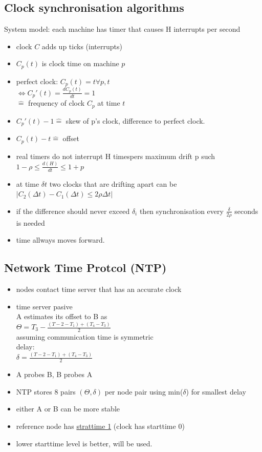 \documentclass[ngerman,a4paper]{report}
\begin{document}
\subsection{Clock synchronisation algorithms}
System model: each machine has timer that causes H interrupts per second
\begin{itemize}
	\item clock $C$ adds up ticks (interrupts)
	\item $C_p(t)$ is clock time on machine $p$
	\item perfect clock: $C_p(t) = t \forall p, t$ \\
	$\Longleftrightarrow C_p'(t) = \frac{d C_p(t)}{dt} = 1$\\
	$\mathrel{\widehat{=}}$ frequency of clock $C_p$ at time $t$
	\item $C_p'(t) - 1 \mathrel{\widehat{=}}$ skew of p's clock, difference to perfect clock.
	\item $C_p(t)-t \mathrel{\widehat{=}}$ offset
	\item real timers do not interrupt H timespers maximum drift p such\\
	$1-\rho \leq \frac {d(H)}{dt} \leq 1+p$
	\item at time $\delta t$ two clocks that are drifting apart can be\\
	$|C_2(\Delta t) - C_1(\Delta t) \leq 2 \rho \Delta t|$
	\item if the difference should never exceed $\delta_i$ then synchronisation every $\frac {\delta}{2 \rho}$ seconds is needed
	\item time allways moves forward.
\end{itemize}


\subsection{Network Time Protcol (NTP)}
\begin{itemize}
\item nodes contact time server that has an accurate clock
\item time server pasive\\
A estimates its offset to B as\\
$\Theta = T_3 - \frac{(T-2 - T_1) + (T_4 - T_3)}{2}$\\
assuming communication time is symmetric\\
delay:\\
$\delta = \frac{(T-2 - T_1) + (T_4 - T_3)}{2}$
\item A probes B, B probes A
\item NTP stores 8 pairs $(\Theta, \delta)$ per node pair using min($\delta$) for smallest delay
\item either A or B can be more stable
\item reference node has \underline{strattime  1} (clock has starttime 0)
\item lower starttime level is better, will be used.
\end{itemize}
\end{document}
